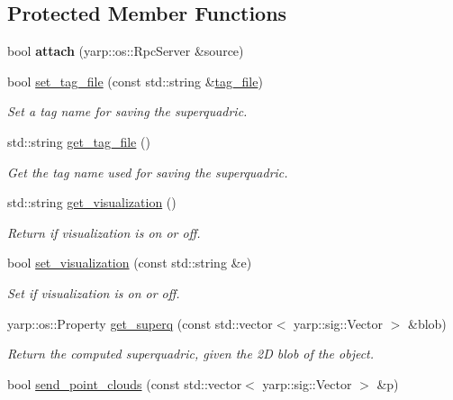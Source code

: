 \subsection*{Protected Member Functions}
\begin{DoxyCompactItemize}
\item 
\mbox{\label{classSuperqModule_a561e16c3b62e17a2fb96193c079bd970}} 
bool {\bfseries attach} (yarp\+::os\+::\+Rpc\+Server \&source)
\item 
bool \mbox{\hyperlink{classSuperqModule_ae9f0cfead2c367e4c3aa25292b5c42c6}{set\+\_\+tag\+\_\+file}} (const std\+::string \&\mbox{\hyperlink{classSuperqModule_a06b5f43aeaa26b5ca5961670f8883ab4}{tag\+\_\+file}})
\begin{DoxyCompactList}\small\item\em Set a tag name for saving the superquadric. \end{DoxyCompactList}\item 
std\+::string \mbox{\hyperlink{classSuperqModule_ac5475155a5a1b05e5fdef54699cef1a6}{get\+\_\+tag\+\_\+file}} ()
\begin{DoxyCompactList}\small\item\em Get the tag name used for saving the superquadric. \end{DoxyCompactList}\item 
std\+::string \mbox{\hyperlink{classSuperqModule_a89be4778051c4dd19339021448f89b41}{get\+\_\+visualization}} ()
\begin{DoxyCompactList}\small\item\em Return if visualization is on or off. \end{DoxyCompactList}\item 
bool \mbox{\hyperlink{classSuperqModule_ae4fc54ad89b3ee72ab5ea8c8b5065866}{set\+\_\+visualization}} (const std\+::string \&e)
\begin{DoxyCompactList}\small\item\em Set if visualization is on or off. \end{DoxyCompactList}\item 
yarp\+::os\+::\+Property \mbox{\hyperlink{classSuperqModule_a4a28afabfeac67e807dcc32845b41e0c}{get\+\_\+superq}} (const std\+::vector$<$ yarp\+::sig\+::\+Vector $>$ \&blob)
\begin{DoxyCompactList}\small\item\em Return the computed superquadric, given the 2D blob of the object. \end{DoxyCompactList}\item 
bool \mbox{\hyperlink{classSuperqModule_aa5a3fb751dd83d96004fceebab14c139}{send\+\_\+point\+\_\+clouds}} (const std\+::vector$<$ yarp\+::sig\+::\+Vector $>$ \&p)

\end{DoxyCompactItemize}

